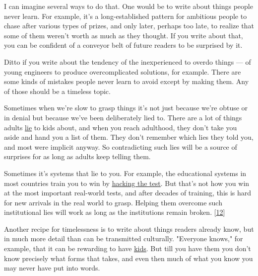 I can imagine several ways to do that. One would
                  be to write about things people never learn. For example, it's
                  a long-established pattern for ambitious people to chase after
                  various types of prizes, and only later, perhaps too late, to
                  realize that some of them weren't worth as much as they
                  thought. If you write about that, you can be confident of a
                  conveyor belt of future readers to be surprised by it.

Ditto
                  if you write about the tendency of the inexperienced to overdo
                  things --- of young engineers to produce overcomplicated
                  solutions, for example. There are some kinds of mistakes
                  people never learn to avoid except by making them. Any of
                  those should be a timeless topic.

Sometimes when
                  we're slow to grasp things it's not just because we're obtuse
                  or in denial but because we've been deliberately lied to.
                  There are a lot of things adults
                  \href{http://www.paulgraham.com/lies.html}{\underline{lie}} to kids about, and when you
                  reach adulthood, they don't take you aside and hand you a list
                  of them. They don't remember which lies they told you, and
                  most were implicit anyway. So contradicting such lies will be
                  a source of surprises for as long as adults keep telling
                  them.

Sometimes it's systems that lie to you. For
                  example, the educational systems in most countries train you
                  to win by \href{http://www.paulgraham.com/lesson.html}{\underline{hacking the test}}. But that's not how you win at the most important real-world
                  tests, and after decades of training, this is hard for new
                  arrivals in the real world to grasp. Helping them overcome
                  such institutional lies will work as long as the institutions
                  remain broken.
                  [\href{\#f12n}{12}]

Another recipe for timelessness is to write about
                  things readers already know, but in much more detail than can
                  be transmitted culturally. "Everyone knows," for example, that
                  it can be rewarding to have \href{http://www.paulgraham.com/kids.html}{\underline{kids}}. But till you have them you don't know precisely what forms
                  that takes, and even then much of what you know you may never
                  have put into words.

